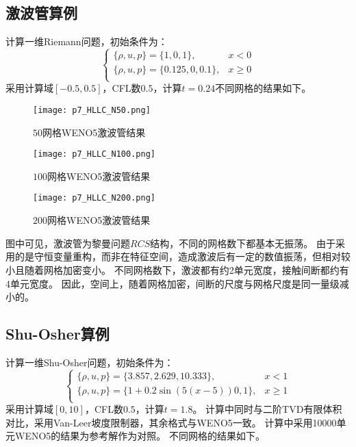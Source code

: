 \documentclass[UTF8,zihao=5]{ctexart} %
\begin{document}
\subsection{激波管算例}

计算一维Riemann问题，初始条件为：
$$
    \left\{
    \begin{array}{ll}
        \{\rho,u,p\} = \{1,0,1\},       & x < 0    \\
        \{\rho,u,p\} = \{0.125,0,0.1\}, & x \geq 0 \\
    \end{array}
    \right.
$$
采用计算域$[-0.5,0.5]$，CFL数$0.5$，计算$t=0.24$不同网格的结果如下。

\begin{figure}[H]
    \centering
    \texttt{[image: p7\_HLLC\_N50.png]}  %
    \caption{$50$网格WENO5激波管结果}
\end{figure}

\begin{figure}[H]
    \centering
    \texttt{[image: p7\_HLLC\_N100.png]}  %
    \caption{$100$网格WENO5激波管结果}
\end{figure}

\begin{figure}[H]
    \centering
    \texttt{[image: p7\_HLLC\_N200.png]}  %
    \caption{$200$网格WENO5激波管结果}
\end{figure}

图中可见，激波管为黎曼问题$RCS$结构，不同的网格数下都基本无振荡。
由于采用的是守恒变量重构，而非在特征空间，造成激波后有一定的数值振荡，但相对较小且随着网格加密变小。
不同网格数下，激波都有约2单元宽度，接触间断都约有4单元宽度。
因此，空间上，随着网格加密，间断的尺度与网格尺度是同一量级减小的。

\subsection{Shu-Osher算例}

计算一维Shu-Osher问题，初始条件为：
$$
    \left\{
    \begin{array}{ll}
        \{\rho,u,p\} = \{3.857,2.629,10.333\},   & x < 1    \\
        \{\rho,u,p\} = \{1+0.2\sin(5(x-5))0,1\}, & x \geq 1 \\
    \end{array}
    \right.
$$
采用计算域$[0,10]$，CFL数$0.5$，计算$t=1.8$。
计算中同时与二阶TVD有限体积对比，采用Van-Leer坡度限制器，其余格式与WENO5一致。
计算中采用10000单元WENO5的结果为参考解作为对照。
不同网格的结果如下。
\end{document}
